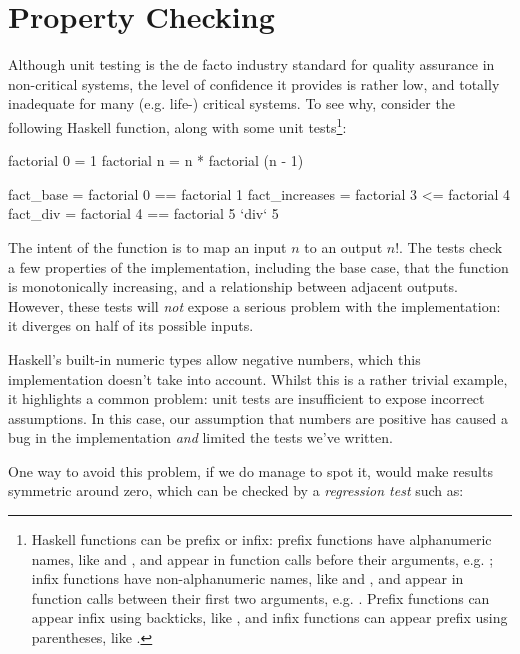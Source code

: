 \section{Property Checking}
\label{sec:propertychecking}


Although unit testing is the de facto industry standard for quality assurance in
non-critical systems, the level of confidence it provides is rather low, and
totally inadequate for many (e.g. life-) critical systems. To see why, consider
the following Haskell function, along with some unit
tests\footnote{Haskell functions can be prefix or infix: prefix functions have
  alphanumeric names, like  and , and appear in function
  calls before their arguments, e.g. ; infix functions have
  non-alphanumeric names, like \hs{+} and \hs{==}, and appear in function calls
  between their first two arguments, e.g. . Prefix functions can
  appear infix using backticks, like , and infix functions can
  appear prefix using parentheses, like .}:

\begin{haskell}
factorial 0 = 1
factorial n = n * factorial (n - 1)

fact_base      = factorial 0 == factorial 1
fact_increases = factorial 3 <= factorial 4
fact_div       = factorial 4 == factorial 5 `div` 5
\end{haskell}

The intent of the function is to map an input $n$ to an output $n!$. The tests
check a few properties of the implementation, including the base case, that the
function is monotonically increasing, and a relationship between adjacent
outputs. However, these tests will \emph{not} expose a serious problem with the
implementation: it diverges on half of its possible inputs.

Haskell's built-in numeric types allow negative numbers, which this
implementation doesn't take into account. Whilst this is a rather trivial
example, it highlights a common problem: unit tests are insufficient to expose
incorrect assumptions. In this case, our assumption that numbers are positive
has caused a bug in the implementation \emph{and} limited the tests we've
written.

One way to avoid this problem, if we do manage to spot it, would make results
symmetric around zero, which can be checked by a \emph{regression test} such as:


